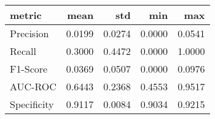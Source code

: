 \begin{tabular}{lrrrr}
\toprule
metric & mean & std & min & max \\
\midrule
Precision & 0.0199 & 0.0274 & 0.0000 & 0.0541 \\
Recall & 0.3000 & 0.4472 & 0.0000 & 1.0000 \\
F1-Score & 0.0369 & 0.0507 & 0.0000 & 0.0976 \\
AUC-ROC & 0.6443 & 0.2368 & 0.4553 & 0.9517 \\
Specificity & 0.9117 & 0.0084 & 0.9034 & 0.9215 \\
\bottomrule
\end{tabular}
